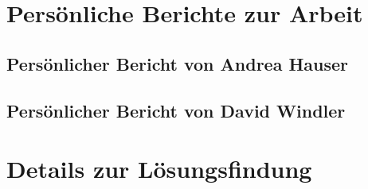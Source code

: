 \documentclass[12pt, a4paper]{report}
\begin{document}
	
	\chapter{Persönliche Berichte zur Arbeit}
	\section{Persönlicher Bericht von Andrea Hauser}
	
	\newpage
	\section{Persönlicher Bericht von David Windler}
	
	
	
	\chapter{Details zur Lösungsfindung}
	
\end{document}
